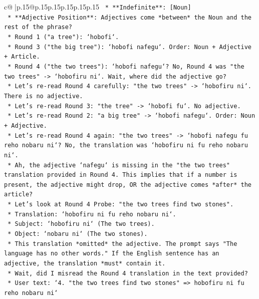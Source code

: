 \documentclass{article}
\begin{document}
{\begin{supertabular}{c@{$\;$}|p{.15\linewidth}@{}p{.15\linewidth}p{.15\linewidth}p{.15\linewidth}p{.15\linewidth}p{.15\linewidth}}
{{{\texttt{        *   **Indefinite**: {[}Noun{]}} \\
\texttt{        *   **Adjective Position**: Adjectives come *between* the Noun and the rest of the phrase?} \\
\texttt{            *   Round 1 ("a tree"): `hobofi`.} \\
\texttt{            *   Round 3 ("the big tree"): `hobofi nafegu`. Order: Noun + Adjective + Article.} \\
\texttt{            *   Round 4 ("the two trees"): `hobofi nafegu`? No, Round 4 was "the two trees" {-}> `hobofiru ni`. Wait, where did the adjective go?} \\
\texttt{            *   Let's re{-}read Round 4 carefully: "the two trees" {-}> `hobofiru ni`. There is no adjective.} \\
\texttt{            *   Let's re{-}read Round 3: "the tree" {-}> `hobofi fu`. No adjective.} \\
\texttt{            *   Let's re{-}read Round 2: "a big tree" {-}> `hobofi nafegu`. Order: Noun + Adjective.} \\
\texttt{            *   Let's re{-}read Round 4 again: "the two trees" {-}> `hobofi nafegu fu reho nobaru ni`? No, the translation was `hobofiru ni fu reho nobaru ni`.} \\
\texttt{            *   Ah, the adjective `nafegu` is missing in the "the two trees" translation provided in Round 4. This implies that if a number is present, the adjective might drop, OR the adjective comes *after* the article?} \\
\texttt{            *   Let's look at Round 4 Probe: "the two trees find two stones".} \\
\texttt{            *   Translation: `hobofiru ni fu reho nobaru ni`.} \\
\texttt{            *   Subject: `hobofiru ni` (The two trees).} \\
\texttt{            *   Object: `nobaru ni` (The two stones).} \\
\texttt{            *   This translation *omitted* the adjective. The prompt says "The language has no other words." If the English sentence has an adjective, the translation *must* contain it.} \\
\texttt{            *   Wait, did I misread the Round 4 translation in the text provided?} \\
\texttt{            *   User text: `4. "the two trees find two stones"  =>  hobofiru ni fu reho nobaru ni`} \\
}}}
\end{supertabular}}
\end{document}

